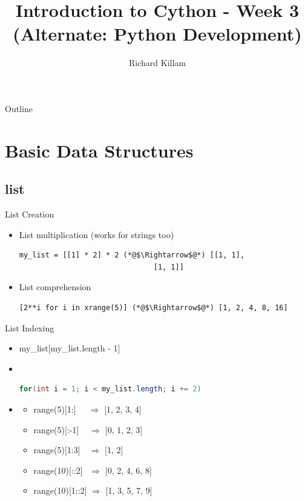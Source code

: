 \documentclass[11pt]{beamer}
\author{Richard Killam}
\title{Introduction to Cython - Week 3 \\ (Alternate: Python Development)}
\begin{document}
\begin{frame}
    \titlepage
\end{frame}

\begin{frame}{Outline}
    \tableofcontents
\end{frame}

\section{Basic Data Structures}
\subsection{list}
\begin{frame}[fragile]{List Creation}
    \begin{itemize}
        \item<1-> List multiplication (works for strings too)
        \begin{lstlisting}
my_list = [[1] * 2] * 2 (*@$\Rightarrow$@*) [[1, 1],
                               [1, 1]]
        \end{lstlisting}

        \item<2-> List comprehension
        \begin{lstlisting}
[2**i for i in xrange(5)] (*@$\Rightarrow$@*) [1, 2, 4, 8, 16]
        \end{lstlisting}
    \end{itemize}
\end{frame}

\begin{frame}[fragile]{List Indexing}
    \begin{itemize}
        \item<1-> my\_list[my\_list.length - 1] 

        \item<3-> $ $ \\
        \begin{lstlisting}[language=Java]
for(int i = 1; i < my_list.length; i += 2)
        \end{lstlisting}

        \item<5->
        \begin{itemize}
                \item[] range(5)[1:]    $\:\:\:\:\:\Rightarrow$ [1, 2, 3, 4]
                \item[] range(5)[:-1]   $\:\:\:\:\Rightarrow$ [0, 1, 2, 3]
                \item[] range(5)[1:3]   $\:\:\:\Rightarrow$ [1, 2]
                \item[] range(10)[::2]  $\:\:\Rightarrow$ [0, 2, 4, 6, 8]
                \item[] range(10)[1::2] $\Rightarrow$ [1, 3, 5, 7, 9]
        \end{itemize}
    \end{itemize}
\end{frame}
\end{document}
